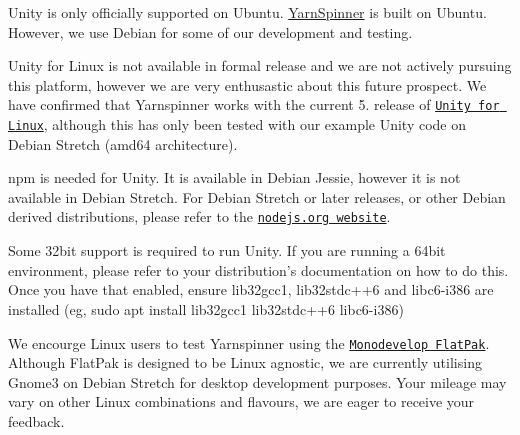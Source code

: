 \begin{DoxyItemize}
\item Unity is only officially supported on Ubuntu. \hyperlink{a00175}{Yarn\-Spinner} is built on Ubuntu. However, we use Debian for some of our development and testing.
\item Unity for Linux is not available in formal release and we are not actively pursuing this platform, however we are very enthusastic about this future prospect. We have confirmed that Yarnspinner works with the current 5. release of \href{https://forum.unity3d.com/threads/unity-on-linux-release-notes-and-known-issues.350256/}{\tt Unity for Linux}, although this has only been tested with our example Unity code on Debian Stretch (amd64 architecture).
\item npm is needed for Unity. It is available in Debian Jessie, however it is not available in Debian Stretch. For Debian Stretch or later releases, or other Debian derived distributions, please refer to the \href{https://nodejs.org/en/download/package-manager/#debian-and-ubuntu-based-linux-distributions}{\tt nodejs.\-org website}.
\item Some 32bit support is required to run Unity. If you are running a 64bit environment, please refer to your distribution's documentation on how to do this. Once you have that enabled, ensure lib32gcc1, lib32stdc++6 and libc6-\/i386 are installed (eg, {\ttfamily sudo apt install lib32gcc1 lib32stdc++6 libc6-\/i386})
\item We encourge Linux users to test Yarnspinner using the \href{http://www.monodevelop.com/download/linux/}{\tt Monodevelop Flat\-Pak}. Although Flat\-Pak is designed to be Linux agnostic, we are currently utilising Gnome3 on Debian Stretch for desktop development purposes. Your mileage may vary on other Linux combinations and flavours, we are eager to receive your feedback. 
\end{DoxyItemize}